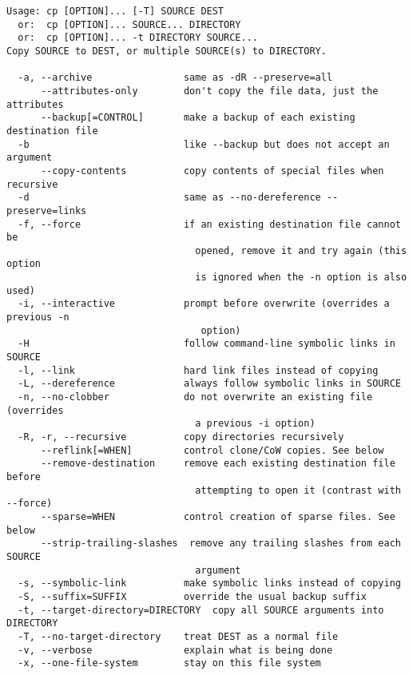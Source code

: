 \documentclass[11pt,a4paper]{article}
\begin{document}
\begin{verbatim}
Usage: cp [OPTION]... [-T] SOURCE DEST
  or:  cp [OPTION]... SOURCE... DIRECTORY
  or:  cp [OPTION]... -t DIRECTORY SOURCE...
Copy SOURCE to DEST, or multiple SOURCE(s) to DIRECTORY.

  -a, --archive                same as -dR --preserve=all
      --attributes-only        don't copy the file data, just the attributes
      --backup[=CONTROL]       make a backup of each existing destination file
  -b                           like --backup but does not accept an argument
      --copy-contents          copy contents of special files when recursive
  -d                           same as --no-dereference --preserve=links
  -f, --force                  if an existing destination file cannot be
                                 opened, remove it and try again (this option
                                 is ignored when the -n option is also used)
  -i, --interactive            prompt before overwrite (overrides a previous -n
                                  option)
  -H                           follow command-line symbolic links in SOURCE
  -l, --link                   hard link files instead of copying
  -L, --dereference            always follow symbolic links in SOURCE
  -n, --no-clobber             do not overwrite an existing file (overrides
                                 a previous -i option)
  -R, -r, --recursive          copy directories recursively
      --reflink[=WHEN]         control clone/CoW copies. See below
      --remove-destination     remove each existing destination file before
                                 attempting to open it (contrast with --force)
      --sparse=WHEN            control creation of sparse files. See below
      --strip-trailing-slashes  remove any trailing slashes from each SOURCE
                                 argument
  -s, --symbolic-link          make symbolic links instead of copying
  -S, --suffix=SUFFIX          override the usual backup suffix
  -t, --target-directory=DIRECTORY  copy all SOURCE arguments into DIRECTORY
  -T, --no-target-directory    treat DEST as a normal file
  -v, --verbose                explain what is being done
  -x, --one-file-system        stay on this file system
\end{verbatim}
\end{document}

